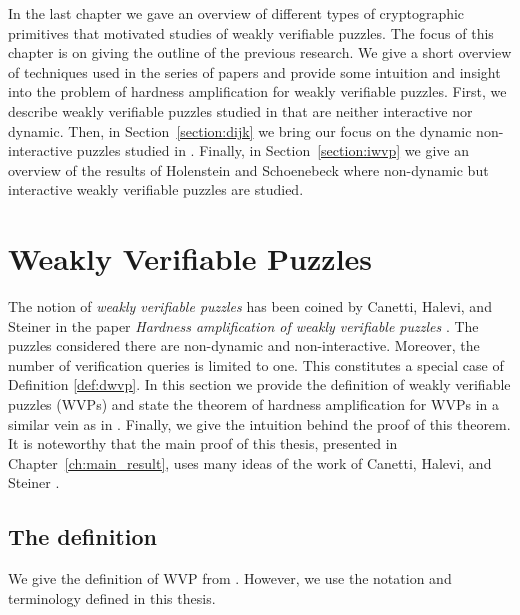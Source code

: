 \label{st:previous_results}
In the last chapter we gave an overview of different types of cryptographic primitives that motivated studies of weakly verifiable puzzles.
The focus of this chapter is on giving the outline of the previous research.
We give a short overview of techniques used in the series of papers \cite{canetti2004hardness, Dodis:2009:SAI:1530441.1530450, DBLP:journals/corr/abs-1002-3534}
and provide some intuition and insight into the problem of hardness amplification for weakly verifiable puzzles.
First, we describe weakly verifiable puzzles studied in \cite{canetti2004hardness} that are neither interactive nor dynamic.
Then, in Section~\ref{section:dijk} we bring our focus on the dynamic non-interactive puzzles studied in \cite{Dodis:2009:SAI:1530441.1530450}.
Finally, in Section~\ref{section:iwvp} we give an overview of the results of Holenstein and Schoenebeck \cite{DBLP:journals/corr/abs-1002-3534}
where non-dynamic but interactive weakly verifiable puzzles are studied.
%
\section{Weakly Verifiable Puzzles}
\label{subsec:chs}
The notion of \textit{weakly verifiable puzzles} has been coined by Canetti, Halevi, and Steiner in the paper
\textit{Hardness amplification of weakly verifiable puzzles} \cite{canetti2004hardness}.
The puzzles considered there are non-dynamic and non-interactive.
Moreover, the number of verification queries is limited to one. This constitutes a special case of Definition \ref{def:dwvp}.
In this section we provide the definition of weakly verifiable puzzles (WVPs) and state the theorem of hardness amplification for WVPs
in a similar vein as in \cite{canetti2004hardness}.
Finally, we give the intuition behind the proof of this theorem. It is noteworthy that the main proof of this thesis,
presented in Chapter~\ref{ch:main_result}, uses many ideas of the work of Canetti, Halevi, and Steiner \cite{canetti2004hardness}.
%
\subsection{The definition}
We give the definition of WVP from \cite{canetti2004hardness}. However, we use the notation and terminology defined in this thesis.

